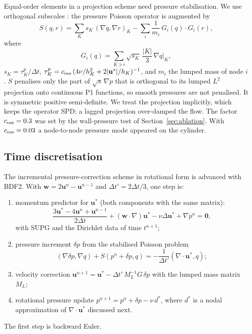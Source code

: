 \documentclass[preprint,12pt,number]{elsarticle}
\newcommand{\bu}{\mathbf{u}}
\newcommand{\bw}{\mathbf{w}}
\newcommand{\dt}{\Delta t}
\begin{document}
Equal-order elements in a projection scheme need pressure stabilisation. We use orthogonal
subscales \citep{codina2000oss,codina2001}: the pressure Poisson operator is augmented by
\begin{equation}
S(q, r) = \sum_K s_K\,(\nabla q, \nabla r)_K
- \sum_i \frac{1}{m_i}\,G_i(q)\cdot G_i(r),
\label{eq:oss}
\end{equation}
where
\[
G_i(q) = \sum_{K\ni i}\sqrt{s_K}\,\frac{|K|}{3}\,\nabla q|_K,
\]
$s_K = \tau^p_K/\dt$, $\tau^p_K = c_{\rm oss}\,(4\nu/h_K^2 + 2|\bu^*|/h_K)^{-1}$,
and $m_i$ the lumped mass of node $i$. $S$ penalises only the part of $\sqrt{s}\,\nabla p$
that is orthogonal to its lumped $L^2$ projection onto continuous P1 functions, so smooth
pressures are not penalised. It is symmetric positive semi-definite. We treat the projection
implicitly, which keeps the operator SPD; a lagged projection over-damped the flow. The
factor $c_{\rm oss} = 0.3$ was set by the wall-pressure test of Section~\ref{sec:ablation}.
With $c_{\rm oss} = 0.03$ a node-to-node pressure mode appeared on the cylinder.

\subsection{Time discretisation}
\label{sec:time-disc}

The incremental pressure-correction scheme in rotational form \citep{timmermans1996,guermond2006}
is advanced with BDF2. With $\bw = 2\bu^n - \bu^{n-1}$ and $\dt' = 2\dt/3$, one step is:
\begin{enumerate}
\item momentum predictor for $\bu^*$ (both components with the same matrix):
\[
\frac{3\bu^* - 4\bu^n + \bu^{n-1}}{2\dt} + (\bw\cdot\nabla)\bu^* - \nu\Delta\bu^* + \nabla p^n = \mathbf{0},
\]
with SUPG and the Dirichlet data of time $t^{n+1}$;
\item pressure increment $\delta p$ from the stabilised Poisson problem
\[
(\nabla\delta p, \nabla q) + S(p^n + \delta p, q) = -\frac{1}{\dt'}(\nabla\cdot\bu^*, q);
\]
\item velocity correction $\bu^{n+1} = \bu^* - \dt'\,M_L^{-1}G\,\delta p$ with the lumped
  mass matrix $M_L$;
\item rotational pressure update $p^{n+1} = p^n + \delta p - \nu\,d^*$, where $d^*$ is a
  nodal approximation of $\nabla\cdot\bu^*$ discussed next.
\end{enumerate}
The first step is backward Euler.
\end{document}
